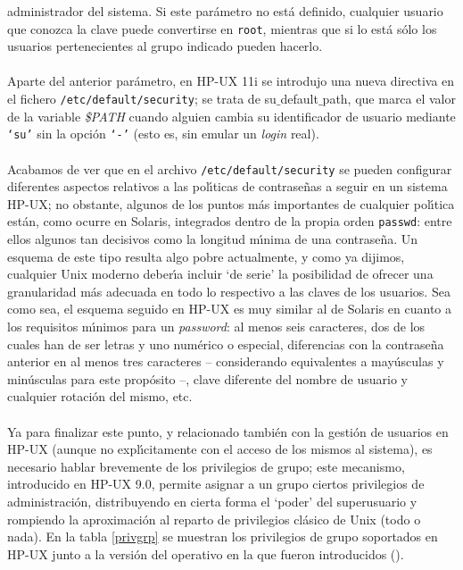 administrador del sistema. Si este par\'ametro no est\'a definido, cualquier
usuario que conozca la clave puede convertirse en {\tt root}, mientras que si
lo est\'a s\'olo los usuarios pertenecientes al grupo indicado pueden hacerlo.\\
\\Aparte del anterior par\'ametro, en HP-UX 11i se introdujo una nueva 
directiva en el fichero {\tt /etc/default/security}; se
trata de {\sc su$\_$default$\_$path}, que marca el valor de la variable {\it
\$PATH} cuando alguien cambia su identificador de usuario mediante {\tt `su'} 
sin la opci\'on {\tt `-'} (esto es, sin emular un {\it login} real).\\
\\Acabamos de ver que en el archivo {\tt /etc/default/security} se pueden
configurar diferentes aspectos relativos a las pol\'{\i}ticas de contrase\~nas a
seguir en un sistema HP-UX; no obstante, algunos de los puntos m\'as importantes
de cualquier pol\'{\i}tica est\'an, como ocurre en Solaris, integrados dentro
de la propia orden {\tt passwd}: entre ellos algunos tan decisivos como la
longitud m\'{\i}nima de una contrase\~na. Un esquema de este tipo resulta algo
pobre actualmente, y como ya dijimos, cualquier Unix moderno deber\'{\i}a 
incluir `de serie' la posibilidad de ofrecer una granularidad m\'as adecuada en
todo lo respectivo a las claves de los usuarios. Sea como sea, el esquema 
seguido en HP-UX es muy similar al de Solaris en cuanto a los requisitos 
m\'{\i}nimos para un {\it password}: al menos seis caracteres, dos de los cuales
han de ser letras y uno num\'erico o especial, diferencias con la contrase\~na
anterior en al menos tres caracteres -- considerando equivalentes a may\'usculas
y min\'usculas para este prop\'osito --, clave diferente del nombre de usuario
y cualquier rotaci\'on del mismo, etc.\\
\\Ya para finalizar este punto, y relacionado tambi\'en con la gesti\'on de 
usuarios en HP-UX (aunque no expl\'{\i}citamente con el acceso de los mismos al 
sistema), es 
necesario hablar brevemente de los privilegios de grupo; este mecanismo, 
introducido en HP-UX 9.0, permite asignar a un grupo ciertos privilegios de
administraci\'on, distribuyendo en cierta forma el `poder' del superusuario y
rompiendo la aproximaci\'on al reparto de privilegios cl\'asico de Unix (todo o
nada). En la tabla \ref{privgrp} se muestran los privilegios de grupo
soportados en HP-UX junto a la versi\'on del operativo en la que fueron 
introducidos (\cite{kn:hpfaq}).\\
